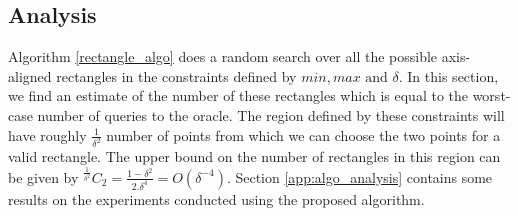 
\subsection{Analysis}
\label{algo_analysis}
Algorithm \ref{rectangle_algo} does a random search over all the possible axis-aligned rectangles in the constraints defined by $min, max \text{ and } \delta$. In this section, we find an estimate of the number of these rectangles which is equal to the worst-case number of queries to the oracle. The region defined by these constraints will have roughly $\frac{1}{\delta^2}$ number of points from which we can choose the two points for a valid rectangle. The upper bound on the number of rectangles in this region can be given by $^{\frac{1}{\delta^2}}C_2 = \frac{1-\delta^2}{2.\delta^4} = O(\delta^{-4})$. Section \ref{app:algo_analysis} contains some results on the experiments conducted using the proposed algorithm.
